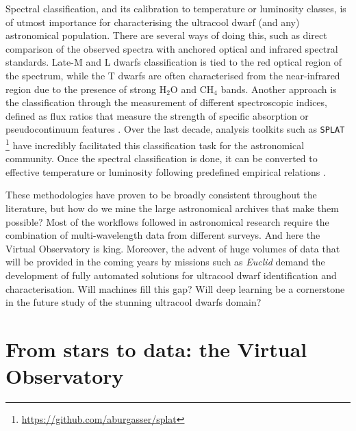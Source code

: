 Spectral classification, and its calibration to temperature or luminosity classes, is of utmost importance for characterising the ultracool dwarf (and any) astronomical population. There are several ways of doing this, such as direct comparison of the observed spectra with anchored optical \citep{kirkpatrick1999} and infrared \citep{burgasser2006,kirkpatrick2010,cushing2011} spectral standards. Late-M and L dwarfs classification is tied to the red optical region of the spectrum, while the T dwarfs are often characterised from the near-infrared region due to the presence of strong H$_2$O and CH$_4$ bands. Another approach is the classification through the measurement of different spectroscopic indices, defined as flux ratios that measure the strength of specific absorption or pseudocontinuum features \citep{kirkpatrick1995,martin1997,Martin1999,burgasser2007}. Over the last decade, analysis toolkits such as \texttt{SPLAT} \citep{splat}\,\footnote{\url{https://github.com/aburgasser/splat}}  have incredibly facilitated this classification task for the astronomical community. Once the spectral classification is done, it can be converted to effective temperature or luminosity following predefined empirical relations \citep{pecaut2013,filippazzo2015,kirkpatrick2021}.

These methodologies have proven to be broadly consistent throughout the literature, but how do we mine the large astronomical archives that make them possible? Most of the workflows followed in astronomical research require the combination of multi-wavelength data from different surveys. And here the Virtual Observatory is king. Moreover, the advent of huge volumes of data that will be provided in the coming years by missions such as \textit{Euclid} \citep{euclid} demand the development of fully automated solutions for ultracool dwarf identification and characterisation. Will machines fill this gap? Will deep learning be a cornerstone in the future study of the stunning ultracool dwarfs domain?




\section{From stars to data: the Virtual Observatory} \label{chp:vo_intro}

